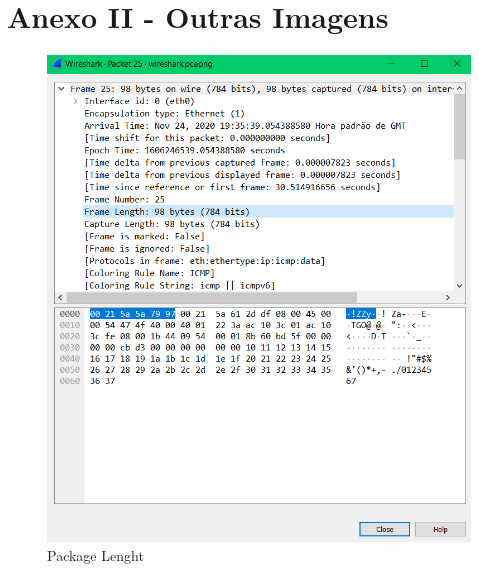 \documentclass[article, a4paper, 11pt, oneside]{memoir}
\begin{document}
\section{Anexo II - Outras Imagens}
\begin{figure}[h]
	\centering
\includegraphics[scale=0.30]{package-length.png}
\caption{Package Lenght}
\end{figure}
\end{document}
